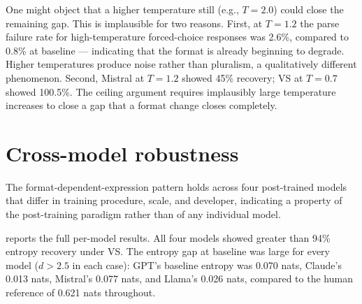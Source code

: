 One might object that a higher temperature still (e.g., $T{=}2.0$) could
close the remaining gap. This is implausible for two reasons. First, at
$T{=}1.2$ the parse failure rate for high-temperature forced-choice
responses was 2.6\%, compared to 0.8\% at baseline — indicating that the
format is already beginning to degrade. Higher temperatures produce
noise rather than pluralism, a qualitatively different phenomenon.
Second, Mistral at $T{=}1.2$ showed 45\% recovery; VS at $T{=}0.7$
showed 100.5\%. The ceiling argument requires implausibly large
temperature increases to close a gap that a format change closes
completely.

\section{Cross-model robustness}
\label{sec:d1_crossmodel}

The format-dependent-expression pattern holds across four post-trained
models that differ in training procedure, scale, and developer,
indicating a property
of the post-training paradigm rather than of any individual model.

 reports the full per-model results. All
four models showed greater than 94\% entropy recovery under VS. The
entropy gap at baseline was large for every model ($d > 2.5$ in each
case): GPT's baseline entropy was 0.070 nats, Claude's 0.013 nats,
Mistral's 0.077 nats, and Llama's 0.026 nats, compared to the human
reference of 0.621 nats throughout.


